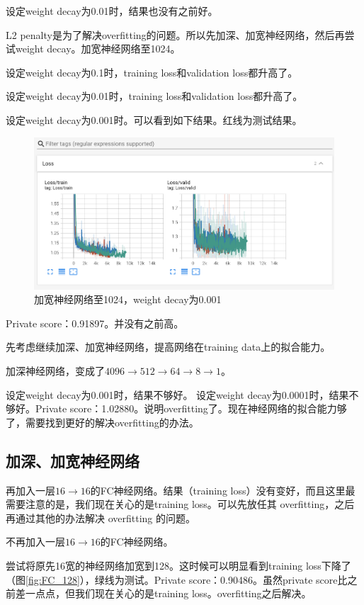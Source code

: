 \documentclass{article}
\begin{document}
\begin{CJK}{UTF8}{gbsn}
设定weight decay为0.01时，结果也没有之前好。

L2 penalty是为了解决overfitting的问题。所以先加深、加宽神经网络，然后再尝试weight decay。加宽神经网络至1024。

设定weight decay为0.1时，training loss和validation loss都升高了。

设定weight decay为0.01时，training loss和validation loss都升高了。

设定weight decay为0.001时。可以看到如下结果。红线为测试结果。
\begin{figure}[htbp]
    \centering
    \includegraphics[width=\linewidth]{graphics/FC_1024_weight_decay_0_001.png}
    \caption{加宽神经网络至1024，weight decay为0.001}
    \label{fig:FC_1024_weight_decay_0_001}
\end{figure}
Private score：0.91897。并没有之前高。

先考虑继续加深、加宽神经网络，提高网络在training data上的拟合能力。

加深神经网络，变成了$4096 \rightarrow 512 \rightarrow 64 \rightarrow 8 \rightarrow 1$。

设定weight decay为0.001时，结果不够好。
设定weight decay为0.0001时，结果不够好。Private score：1.02880。说明overfitting了。现在神经网络的拟合能力够了，需要找到更好的解决overfitting的办法。

\subsection{加深、加宽神经网络}

再加入一层$16 \rightarrow 16$的FC神经网络。结果（training loss）没有变好，而且这里最需要注意的是，我们现在关心的是training loss。可以先放任其 overfitting，之后再通过其他的办法解决 overfitting 的问题。 

不再加入一层$16 \rightarrow 16$的FC神经网络。

尝试将原先16宽的神经网络加宽到128。这时候可以明显看到training loss下降了（图\ref{fig:FC_128}），绿线为测试。Private score：0.90486。虽然private score比之前差一点点，但我们现在关心的是training loss。overfitting之后解决。


\end{CJK}
\end{document}
